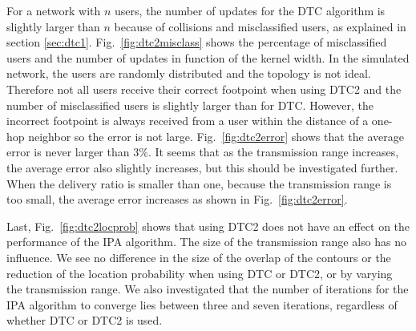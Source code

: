 For a network with $n$ users, the number of updates for the DTC algorithm is slightly larger than $n$ because of collisions and misclassified users, as explained in section \ref{sec:dtc1}. Fig.~\ref{fig:dtc2misclass} shows the percentage of misclassified users and the number of updates in function of the kernel width. In the simulated network, the users are randomly distributed and the topology is not ideal. Therefore not all users receive their correct footpoint when using DTC2 and the number of misclassified users is slightly larger than for DTC. However, the incorrect footpoint is always received from a user within the distance of a one-hop neighbor so the error is not large. Fig.~\ref{fig:dtc2error} shows that the average error is never larger than $3\%$. It seems that as the transmission range increases, the average error also slightly increases, but this should be investigated further. When the delivery ratio is smaller than one, because the transmission range is too small, the average error increases as shown in Fig.~\ref{fig:dtc2error}. 

Last, Fig.~\ref{fig:dtc2locprob} shows that using DTC2 does not have an effect on the performance of the IPA algorithm. The size of the transmission range also has no influence. We see no difference in the size of the overlap of the contours or the reduction of the location probability when using DTC or DTC2, or by varying the transmission range. We also investigated that the number of iterations for the IPA algorithm to converge lies between three and seven iterations, regardless of whether DTC or DTC2 is used.


